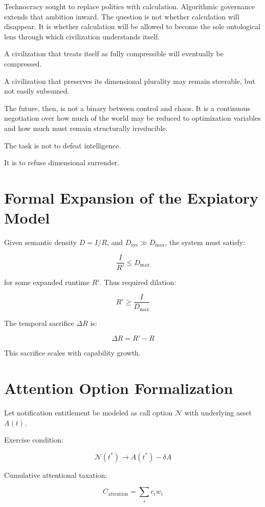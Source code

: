 \documentclass[12pt]{article}
\begin{document}
Technocracy sought to replace politics with calculation. Algorithmic governance extends that ambition inward. The question is not whether calculation will disappear. It is whether calculation will be allowed to become the sole ontological lens through which civilization understands itself.

A civilization that treats itself as fully compressible will eventually be compressed.

A civilization that preserves its dimensional plurality may remain steerable, but not easily subsumed.

The future, then, is not a binary between control and chaos. It is a continuous negotiation over how much of the world may be reduced to optimization variables and how much must remain structurally irreducible.

The task is not to defeat intelligence.

It is to refuse dimensional surrender.


\appendix

\section{Formal Expansion of the Expiatory Model}

Given semantic density $D = I/R$, and $D_{\text{sys}} \gg D_{\max}$, the system must satisfy:

\[
\frac{I}{R'} \le D_{\max}
\]

for some expanded runtime $R'$. Thus required dilation:

\[
R' \ge \frac{I}{D_{\max}}
\]

The temporal sacrifice $\Delta R$ is:

\[
\Delta R = R' - R
\]

This sacrifice scales with capability growth.

\section{Attention Option Formalization}

Let notification entitlement be modeled as call option $\mathcal{N}$ with underlying asset $A(t)$.

Exercise condition:

\[
\mathcal{N}(t^\ast) \rightarrow A(t^\ast) - \delta A
\]

Cumulative attentional taxation:

\[
C_{\text{attention}} = \sum_i c_i w_i
\]
\end{document}
